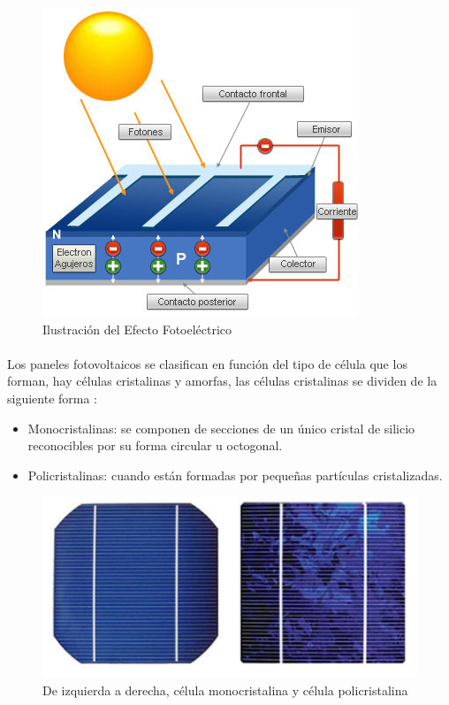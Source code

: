\begin{figure}[H]
	\centering
	\includegraphics[scale=.50]{Capitulo2/images/celula-fotovoltaica.jpg}
	\caption{Ilustración del Efecto Fotoeléctrico}
	\label{fig:diagrama_dispensador}
\end{figure}

\paragraph{}
Los paneles fotovoltaicos se clasifican en función del tipo de célula que los forman, hay células cristalinas y amorfas, las células cristalinas se dividen de la siguiente forma :

\begin{itemize}
	\item Monocristalinas: se componen de secciones de un único cristal de silicio reconocibles por su forma circular u octogonal.
	\item Policristalinas: cuando están formadas por pequeñas partículas cristalizadas.
\end{itemize}

\begin{figure}[H]
	\centering
	\includegraphics[scale=.50]{Capitulo2/images/tipospaneles.jpg}
	\caption{De izquierda a derecha, célula monocristalina y célula policristalina}
	\label{fig:diagrama_dispensador}
\end{figure}

